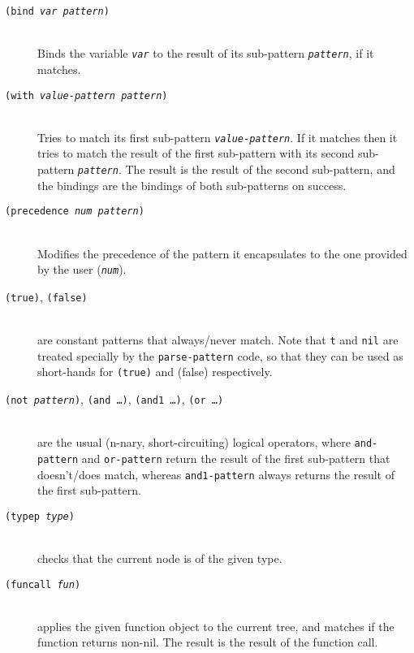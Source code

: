 \documentclass[a4paper,11pt]{scrartcl}
\begin{document}
\begin{description}
\item[\texttt{(bind \textsl{var} \textsl{pattern})}]\hspace{2cm}\\
  Binds the variable \texttt{\textsl{var}} to the result of its
  sub-pattern \texttt{\textsl{pattern}}, if it matches.
\item[\texttt{(with \textsl{value-pattern} \textsl{pattern})}]\hspace{2cm}\\
  Tries to match its first sub-pattern
  \texttt{\textsl{value-pattern}}.  If it matches then it tries to
  match the result of the first sub-pattern with its second
  sub-pattern \texttt{\textsl{pattern}}.  The result is the result of
  the second sub-pattern, and the bindings are the bindings of both
  sub-patterns on success.
\item[\texttt{(precedence \textsl{num} \textsl{pattern})}]\hspace{2cm}\\
  Modifies the precedence of the pattern it encapsulates to the one
  provided by the user (\texttt{\textsl{num}}).
\item[\texttt{(true)}, \texttt{(false)}]\hspace{2cm}\\
  are constant patterns that always/never match.  Note that \texttt{t}
  and \texttt{nil} are treated specially by the \texttt{parse-pattern}
  code, so that they can be used as short-hands for \texttt{(true)}
  and \textrm{(false)} respectively.
\item[\texttt{(not \textsl{pattern})}, \texttt{(and \dots)},
  \texttt{(and1 \dots)}, \texttt{(or \dots)}]\hspace{2cm}\\
  are the usual (n-nary, short-circuiting) logical operators,
  where \texttt{and-pattern} and \texttt{or-pattern} return the result
  of the first sub-pattern that doesn't/does match, whereas
  \texttt{and1-pattern} always returns the result of the first
  sub-pattern.
\item[\texttt{(typep \textsl{type})}]\hspace{2cm}\\
  checks that the current node is of the given type.
\item[\texttt{(funcall \textsl{fun})}]\hspace{2cm}\\
  applies the given function object to the current tree, and matches
  if the function returns non-nil.  The result is the result of the
  function call.
\end{description}
\end{document}
